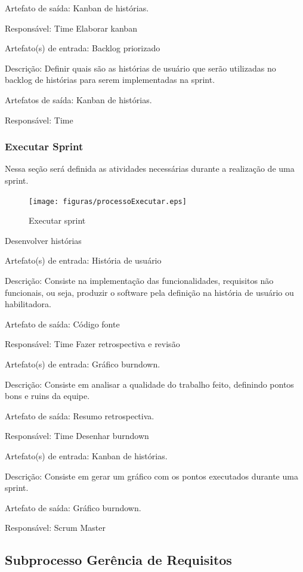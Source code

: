 Artefato de saída: Kanban de histórias.

Responsável: Time
Elaborar kanban

Artefato(s) de entrada: Backlog priorizado

Descrição: Definir quais são as histórias de usuário que serão utilizadas no backlog de histórias para serem implementadas na sprint.

Artefatos de saída: Kanban de histórias.

Responsável: Time

\subsubsection{Executar Sprint}

Nessa seção será definida as atividades necessárias durante a realização de uma sprint.

\begin{figure}[H]
    \centering
    \caption{Executar sprint}
    \label{processoExecutar}
    \texttt{[image: figuras/processoExecutar.eps]}
\end{figure}

Desenvolver histórias

Artefato(s) de entrada: História de usuário

Descrição: Consiste na implementação das funcionalidades, requisitos não funcionais, ou seja, produzir o software pela definição na história de usuário ou habilitadora.

Artefato de saída: Código fonte

Responsável: Time
Fazer retrospectiva e revisão

Artefato(s) de entrada: Gráfico burndown.

Descrição: Consiste em analisar a qualidade do trabalho feito, definindo pontos bons e ruins da equipe.

Artefato de saída: Resumo retrospectiva.

Responsável: Time
Desenhar burndown

Artefato(s) de entrada: Kanban de histórias.

Descrição: Consiste em gerar um gráfico com os pontos executados durante uma sprint.

Artefato de saída: Gráfico burndown.

Responsável: Scrum Master


\subsection{Subprocesso Gerência de Requisitos}

